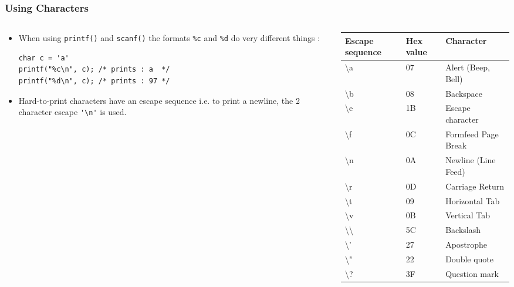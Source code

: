 

\begin{frame}[fragile]
\frametitle{Using Characters}
\begin{columns}

\begin{column}{0.45\textwidth}
\begin{itemize}
\item When using \verb^printf()^ and \verb^scanf()^ the formats
\verb^%c^ and \verb^%d^ do very different things :
\begin{verbatim}
char c = 'a'
printf("%c\n", c); /* prints : a  */
printf("%d\n", c); /* prints : 97 */
\end{verbatim}
\item Hard-to-print characters have an escape sequence
i.e. to print a newline, the 2 character escape \verb^'\n'^ is used.
\end{itemize}
\end{column}

\begin{column}{0.55\textwidth}
{\small
\begin{tabular}{|l|l|l|}\hline
Escape sequence	& Hex value & Character \\ \hline
\textbackslash a & 07 & Alert (Beep, Bell)\\
\textbackslash b &08&Backspace\\
\textbackslash e &1B&Escape character\\
\textbackslash f &0C&Formfeed Page Break\\
\textbackslash n &0A&Newline (Line Feed)\\
\textbackslash r &0D&Carriage Return\\
\textbackslash t &09&Horizontal Tab\\
\textbackslash v &0B&Vertical Tab\\
\textbackslash\textbackslash &5C&Backslash\\
\textbackslash ' &27&Apostrophe \\
\textbackslash " &22&Double quote \\
\textbackslash ? &3F&Question mark \\ \hline
\end{tabular}
}
\end{column}

\end{columns}
\end{frame}




